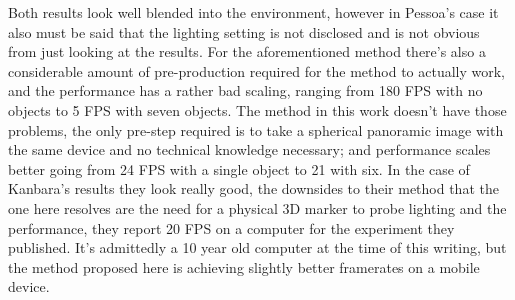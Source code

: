 Both results look well blended into the environment, however in Pessoa's case it also must be said that the lighting setting is not disclosed and is not obvious from just looking at the results. For the aforementioned method there's also a considerable amount of pre-production required for the method to actually work, and the performance has a rather bad scaling, ranging from 180 FPS with no objects to 5 FPS with seven objects. The method in this work doesn't have those problems, the only pre-step required is to take a spherical panoramic image with the same device and no technical knowledge necessary;  and performance scales better going from 24 FPS with a single object to 21 with six.\newline
In the case of Kanbara's results they look really good, the downsides to their method that the one here resolves are the need for a physical 3D marker to probe lighting and the performance, they report 20 FPS on a computer for the experiment they published. It's admittedly a 10 year old computer at the time of this writing, but the method proposed here is achieving slightly better framerates on a mobile device.\newline

